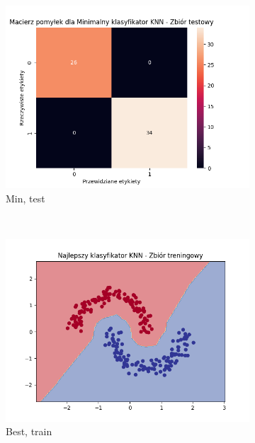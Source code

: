 \documentclass[12pt]{article}
\newcommand*{\subfigwidth}{0.15\textwidth}
\begin{document}
\begin{figure}[H]
\begin{subfigure}[t]{\subfigwidth}
        \includegraphics[width=\linewidth]{img/exp_2/knn/2_2/min/test_matrix.png}
        \caption{Min, test}
    \end{subfigure} 
    \\
    \begin{subfigure}[t]{\subfigwidth}
        \includegraphics[width=\linewidth]{img/exp_2/knn/2_2/best/train_boundary.png}
        \caption{Best, train}
    \end{subfigure}
    \hfill
    \begin{subfigure}[t]{\subfigwidth}

\end{subfigure}
\end{figure}
\end{document}
